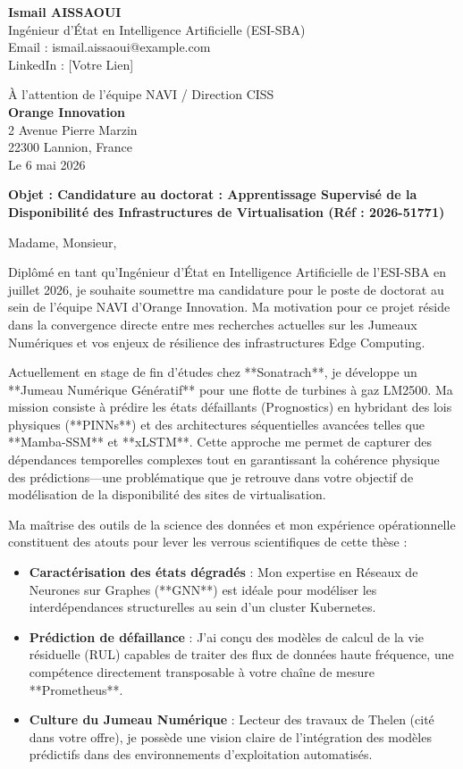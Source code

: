 \documentclass[11pt,a4paper]{article}
\begin{document}
\noindent \textbf{Ismail AISSAOUI} \\
Ingénieur d'État en Intelligence Artificielle (ESI-SBA) \\
Email : ismail.aissaoui@example.com \\
LinkedIn : [Votre Lien]

\bigskip

\begin{flushright}
    À l'attention de l'équipe NAVI / Direction CISS \\
    \textbf{Orange Innovation} \\
    2 Avenue Pierre Marzin \\
    22300 Lannion, France \\
    \medskip
    Le 6 mai 2026
\end{flushright}

\bigskip

\noindent \textbf{Objet : Candidature au doctorat : Apprentissage Supervisé de la Disponibilité des Infrastructures de Virtualisation (Réf : 2026-51771)}

\bigskip

Madame, Monsieur,

Diplômé en tant qu’Ingénieur d’État en Intelligence Artificielle de l’ESI-SBA en juillet 2026, je souhaite soumettre ma candidature pour le poste de doctorat au sein de l’équipe NAVI d’Orange Innovation. Ma motivation pour ce projet réside dans la convergence directe entre mes recherches actuelles sur les Jumeaux Numériques et vos enjeux de résilience des infrastructures Edge Computing.

Actuellement en stage de fin d’études chez **Sonatrach**, je développe un **Jumeau Numérique Génératif** pour une flotte de turbines à gaz LM2500. Ma mission consiste à prédire les états défaillants (Prognostics) en hybridant des lois physiques (**PINNs**) et des architectures séquentielles avancées telles que **Mamba-SSM** et **xLSTM**. Cette approche me permet de capturer des dépendances temporelles complexes tout en garantissant la cohérence physique des prédictions—une problématique que je retrouve dans votre objectif de modélisation de la disponibilité des sites de virtualisation.

Ma maîtrise des outils de la science des données et mon expérience opérationnelle constituent des atouts pour lever les verrous scientifiques de cette thèse :
\begin{itemize}
    \item \textbf{Caractérisation des états dégradés} : Mon expertise en Réseaux de Neurones sur Graphes (**GNN**) est idéale pour modéliser les interdépendances structurelles au sein d'un cluster Kubernetes.
    \item \textbf{Prédiction de défaillance} : J'ai conçu des modèles de calcul de la vie résiduelle (RUL) capables de traiter des flux de données haute fréquence, une compétence directement transposable à votre chaîne de mesure **Prometheus**.
    \item \textbf{Culture du Jumeau Numérique} : Lecteur des travaux de Thelen (cité dans votre offre), je possède une vision claire de l'intégration des modèles prédictifs dans des environnements d'exploitation automatisés.
\end{itemize}
\end{document}
